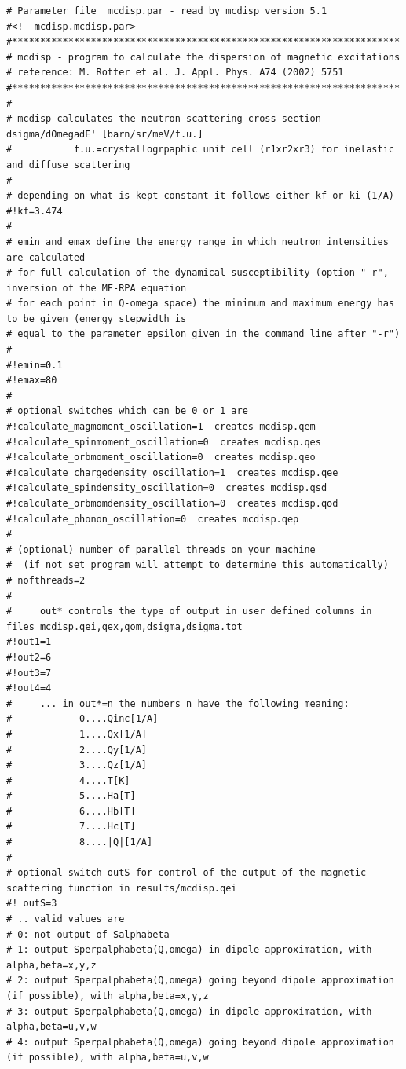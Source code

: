 {\footnotesize
\begin{verbatim}
# Parameter file  mcdisp.par - read by mcdisp version 5.1
#<!--mcdisp.mcdisp.par>
#*********************************************************************
# mcdisp - program to calculate the dispersion of magnetic excitations
# reference: M. Rotter et al. J. Appl. Phys. A74 (2002) 5751
#*********************************************************************
#
# mcdisp calculates the neutron scattering cross section dsigma/dOmegadE' [barn/sr/meV/f.u.]
#           f.u.=crystallogrpaphic unit cell (r1xr2xr3) for inelastic and diffuse scattering
#
# depending on what is kept constant it follows either kf or ki (1/A)
#!kf=3.474
# 
# emin and emax define the energy range in which neutron intensities are calculated
# for full calculation of the dynamical susceptibility (option "-r", inversion of the MF-RPA equation 
# for each point in Q-omega space) the minimum and maximum energy has to be given (energy stepwidth is 
# equal to the parameter epsilon given in the command line after "-r")
#
#!emin=0.1
#!emax=80
#
# optional switches which can be 0 or 1 are
#!calculate_magmoment_oscillation=1  creates mcdisp.qem
#!calculate_spinmoment_oscillation=0  creates mcdisp.qes
#!calculate_orbmoment_oscillation=0  creates mcdisp.qeo
#!calculate_chargedensity_oscillation=1  creates mcdisp.qee
#!calculate_spindensity_oscillation=0  creates mcdisp.qsd
#!calculate_orbmomdensity_oscillation=0  creates mcdisp.qod
#!calculate_phonon_oscillation=0  creates mcdisp.qep
#
# (optional) number of parallel threads on your machine
#  (if not set program will attempt to determine this automatically)
# nofthreads=2
#
#     out* controls the type of output in user defined columns in files mcdisp.qei,qex,qom,dsigma,dsigma.tot
#!out1=1 
#!out2=6 
#!out3=7 
#!out4=4 
#     ... in out*=n the numbers n have the following meaning:
#            0....Qinc[1/A] 
#            1....Qx[1/A]   
#            2....Qy[1/A]   
#            3....Qz[1/A]   
#            4....T[K]      
#            5....Ha[T]     
#            6....Hb[T]     
#            7....Hc[T]     
#            8....|Q|[1/A]  
#
# optional switch outS for control of the output of the magnetic scattering function in results/mcdisp.qei
#! outS=3
# .. valid values are
# 0: not output of Salphabeta
# 1: output Sperpalphabeta(Q,omega) in dipole approximation, with alpha,beta=x,y,z
# 2: output Sperpalphabeta(Q,omega) going beyond dipole approximation (if possible), with alpha,beta=x,y,z
# 3: output Sperpalphabeta(Q,omega) in dipole approximation, with alpha,beta=u,v,w
# 4: output Sperpalphabeta(Q,omega) going beyond dipole approximation (if possible), with alpha,beta=u,v,w

\end{verbatim}}
